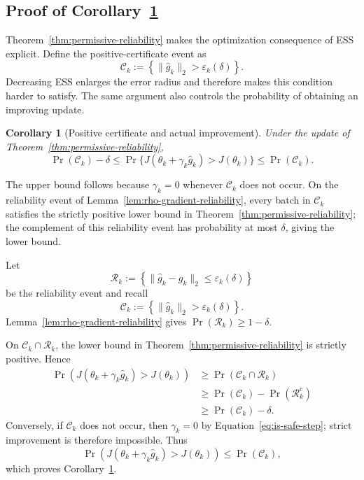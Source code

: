 \documentclass[11pt]{article}
\newtheorem{corollary}[theorem]{Corollary}
\theoremstyle{remark}
\begin{document}
\subsection{Proof of Corollary~\ref{cor:positive-improvement-probability}}


Theorem~\ref{thm:permissive-reliability} makes the optimization consequence of ESS explicit. Define the positive-certificate event as
\begin{equation}
 \mathcal C_k
 :=
 \left\{
 \|\widehat g_k\|_2>\varepsilon_k(\delta)
 \right\}.
 \label{eq:positive-is-certificate}
\end{equation}
Decreasing ESS enlarges the error radius and therefore makes this condition harder to satisfy. The same argument also controls the probability of obtaining an improving
update. 
\begin{corollary}[Positive certificate and actual improvement]
\label{cor:positive-improvement-probability}
Under the update of
Theorem~\ref{thm:permissive-reliability},
\begin{equation}
 \Pr(\mathcal C_k)-\delta
 \le
 \Pr\!\lbrace
 J(\theta_k+\gamma_k\widehat g_k)>J(\theta_k)
 \rbrace
 \le
 \Pr(\mathcal C_k).
 \label{eq:positive-improvement-probability}
\end{equation}
\end{corollary}

The upper bound follows because $\gamma_k=0$ whenever
$\mathcal C_k$ does not occur. On the reliability event of
Lemma~\ref{lem:rho-gradient-reliability}, every batch in $\mathcal C_k$
satisfies the strictly positive lower bound in
Theorem~\ref{thm:permissive-reliability}; the complement of this reliability
event has probability at most $\delta$, giving the lower bound.


Let
\[
 \mathcal R_k
 :=
 \left\{
 \|\widehat g_k-g_k\|_2
 \le
 \varepsilon_k(\delta)
 \right\}
\]
be the reliability event and recall
\[
 \mathcal C_k
 :=
 \left\{
 \|\widehat g_k\|_2>\varepsilon_k(\delta)
 \right\}.
\]
Lemma~\ref{lem:rho-gradient-reliability} gives
$\Pr(\mathcal R_k)\ge1-\delta$.

On $\mathcal C_k\cap\mathcal R_k$, the lower bound in
Theorem~\ref{thm:permissive-reliability} is strictly positive. Hence
\begin{align*}
 \Pr\!\left(
 J(\theta_k+\gamma_k\widehat g_k)>J(\theta_k)
 \right)
 &\ge
 \Pr(\mathcal C_k\cap\mathcal R_k)\\
 &\ge
 \Pr(\mathcal C_k)-\Pr(\mathcal R_k^c)\\
 &\ge
 \Pr(\mathcal C_k)-\delta.
\end{align*}
Conversely, if $\mathcal C_k$ does not occur, then
$\gamma_k=0$ by Equation~\eqref{eq:is-safe-step}; strict improvement is
therefore impossible. Thus
\[
 \Pr\!\left(
 J(\theta_k+\gamma_k\widehat g_k)>J(\theta_k)
 \right)
 \le
 \Pr(\mathcal C_k),
\]
which proves Corollary~\ref{cor:positive-improvement-probability}.
\end{document}
